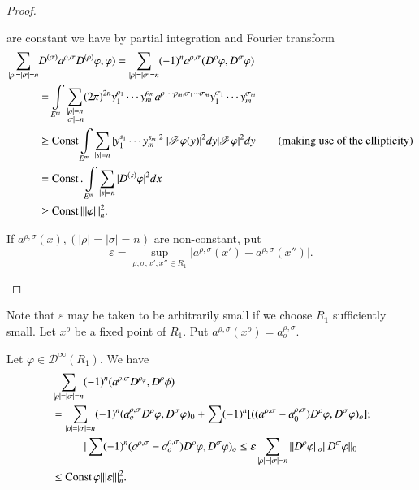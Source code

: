 \begin{proof}
\begin{enumerate} [(i)]
$$  $$
  are constant we have by partial integration and Fourier transform
  \begin{align*}
  \sum_{| \rho | = | \sigma | = n} & D^{(\sigma)} a^{\rho, \sigma}
  D^{(\rho)} \varphi, \varphi) = \sum_{| \rho | = |\sigma| = n}
  (-1)^n a^{\rho, \sigma} (D^\rho \varphi, D^\sigma \varphi) \\
   & = \int\limits_{E^m} \sum_{\substack {| \rho | = n \\ | \sigma
     | = n}} (2 \pi )^{2 n} y_1^{\rho_1} \cdots y_m^{\rho_m}
   a^{\rho_1 \cdots \rho_m, \sigma_1 \cdots \sigma_m}
   y_1^{\sigma_1} \cdots y_m^{\sigma_m}\\ 
   & \ge \const \int\limits_{E^m} \sum_{| s | = n} | y_1^{s_1}
   \cdots y_m^{s_m} |^2 ~ | \mathscr{F} \varphi (y) |^2 dy
   |\mathscr{F} \varphi |^2 dy\tag{\text {making use of the
    ellipticity}}\\ 
   &= \const. \int\limits_{E^m} \sum_{| s | = n} | D^{(s)} \varphi |^2 dx\\
   & \ge \const ||| \varphi |||^2_n.
  \end{align*}

  If $a^{\rho, \sigma} (x), (| \rho | = | \sigma | = n)$ are
  non-constant, put 
  $$
  \varepsilon = \sup_{\rho, \sigma; x', x'' \in R_1} | a^{\rho,
   \sigma} (x') - a^{\rho, \sigma} (x'') |. 
  $$ 
 \end{enumerate}
\end{proof}

Note that $\varepsilon$ may be taken to be arbitrarily small if we
choose $R_1$ sufficiently small. Let $x^o$ be a fixed point of
$R_1$. Put $a^{\rho, \sigma} (x^o) = a_o^{\rho, \sigma}$. 

Let $\varphi \in \mathscr{D}^\infty (R_1)$. We have
\begin{align*}
  &\sum_{| \rho | = |\sigma| = n} (-1)^n (a^{\rho, \sigma}
 D^{\rho_\varphi}, D^\rho \phi)\\
  &= \sum_{| \rho |= | \sigma | = n }(-1)^n (a_o^{\rho, \sigma} D^\rho
 \varphi, D^\sigma \varphi)_0+ \sum (-1)^n [ ((a^{\rho, \sigma} -
  a_0^{\rho, \sigma}) D^\rho \varphi, D^\sigma \varphi )_o ];\\ 
 &\hspace{1cm}| \sum (-1)^n (a^{\rho, \sigma}- a_o^{\rho, \sigma}) D^\rho
 \varphi, D^\sigma \varphi)_o \le \varepsilon \sum_{| \rho | = |
  \sigma | = n} || D^\rho \varphi ||_o || D^\sigma \varphi ||_0\\ 
  &\le \operatorname{Const} \varphi ||| \varepsilon |||^2_n.
\end{align*}

